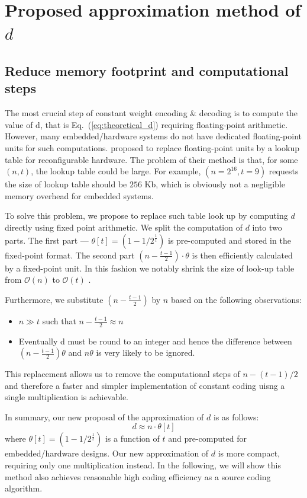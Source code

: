 \documentclass[10pt,journal,compsoc]{IEEEtran}
\begin{document}
\section{Proposed approximation method of $d$}
\subsection{Reduce memory footprint and computational steps}
The most crucial step of constant weight encoding \& decoding is to compute the value of d, that is
 Eq.~(\ref{eq:theoretical_d}) requiring floating-point arithmetic. However, many embedded/hardware systems do not
 have dedicated floating-point units for such computations. \cite{heyse2012towards} proposed to replace floating-point units
 by a lookup table for reconfigurable hardware. The problem of their method is that, for some $(n, t)$, the lookup table
 could be large. For example, $(n=2^{16},t=9)$ requests the size of lookup table should be $256$ Kb, which is
 obviously not a negligible memory overhead for embedded systems.

 To solve this problem, we propose to replace such table look up by computing $d$ directly using fixed point arithmetic.
 We split the computation of $d$ into two parts. The first part --- $\theta[t]=(1-1/2^{\frac{1}{t}})$
 is pre-computed and stored in the fixed-point format. The second part $(n-\frac{t-1}{2})\cdot \theta$ is then efficiently calculated
 by a fixed-point unit.  In this fashion we notably shrink the size of look-up table from $\mathcal{O}(n)$ to $\mathcal{O}(t)$ .

 Furthermore, we substitute $(n-\frac{t-1}{2})$ by $n$ based on the following observations:
 \begin{itemize}
 \item $n \gg t$ such that $n-\frac{t-1}{2} \approx n$
 \item Eventually d must be round to an integer and hence the difference between
                    $(n-\frac{t-1}{2})\theta$ and
                    $n\theta$ is very likely to be ignored.
 \end{itemize}
 This replacement allows us to remove the computational steps of $n-(t-1)/2$ and therefore a faster and simpler
 implementation of constant coding uisng a single multiplication is achievable.

 In summary, our new proposal of the approximation of $d$ is as follows:
 \begin{equation}
    d \approx n\cdot \theta[t]
 \end{equation}
 where $\theta[t]=(1-1/2^{\frac{1}{t}})$ is a function of $t$ and pre-computed for embedded/hardware designs.
 Our new approximation of $d$ is more compact, requiring only one multiplication instead. In the following, we will
 show this method also achieves reasonable high coding efficiency as a source coding algorithm.
\end{document}
